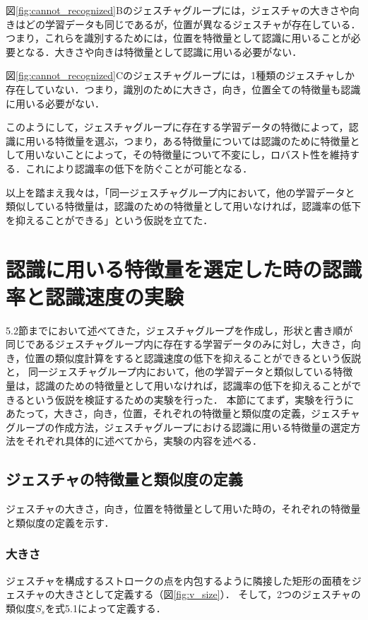 図\ref{fig:cannot_recognized}Bのジェスチャグループには，ジェスチャの大きさや向きはどの学習データも同じであるが，位置が異なるジェスチャが存在している．つまり，これらを識別するためには，位置を特徴量として認識に用いることが必要となる．大きさや向きは特徴量として認識に用いる必要がない．

図\ref{fig:cannot_recognized}Cのジェスチャグループには，1種類のジェスチャしか存在していない．つまり，識別のために大きさ，向き，位置全ての特徴量も認識に用いる必要がない．

このようにして，ジェスチャグループに存在する学習データの特徴によって，認識に用いる特徴量を選ぶ，つまり，ある特徴量については認識のために特徴量として用いないことによって，その特徴量について不変にし，ロバスト性を維持する．これにより認識率の低下を防ぐことが可能となる．

以上を踏まえ我々は，「同一ジェスチャグループ内において，他の学習データと類似している特徴量は，認識のための特徴量として用いなければ，認識率の低下を抑えることができる」という仮説を立てた．

\section{認識に用いる特徴量を選定した時の認識率と認識速度の実験}
5.2節までにおいて述べてきた，ジェスチャグループを作成し，形状と書き順が同じであるジェスチャグループ内に存在する学習データのみに対し，大きさ，向き，位置の類似度計算をすると認識速度の低下を抑えることができるという仮説と，
同一ジェスチャグループ内において，他の学習データと類似している特徴量は，認識のための特徴量として用いなければ，認識率の低下を抑えることができるという仮説を検証するための実験を行った．
本節にてまず，実験を行うにあたって，大きさ，向き，位置，それぞれの特徴量と類似度の定義，ジェスチャグループの作成方法，ジェスチャグループにおける認識に用いる特徴量の選定方法をそれぞれ具体的に述べてから，実験の内容を述べる．

\subsection{ジェスチャの特徴量と類似度の定義}
ジェスチャの大きさ，向き，位置を特徴量として用いた時の，それぞれの特徴量と類似度の定義を示す．

\subsubsection{大きさ}
ジェスチャを構成するストロークの点を内包するように隣接した矩形の面積をジェスチャの大きさとして定義する（図\ref{fig:v_size}）．
そして，2つのジェスチャの類似度$S_\textit{s}$を式5.1によって定義する．

